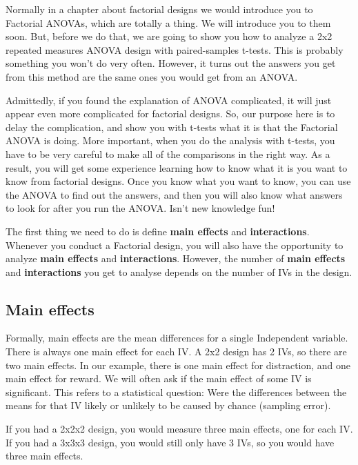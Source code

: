 \documentclass[
]{book}
\begin{document}
Normally in a chapter about factorial designs we would introduce you to Factorial ANOVAs, which are totally a thing. We will introduce you to them soon. But, before we do that, we are going to show you how to analyze a 2x2 repeated measures ANOVA design with paired-samples t-tests. This is probably something you won't do very often. However, it turns out the answers you get from this method are the same ones you would get from an ANOVA.

Admittedly, if you found the explanation of ANOVA complicated, it will just appear even more complicated for factorial designs. So, our purpose here is to delay the complication, and show you with t-tests what it is that the Factorial ANOVA is doing. More important, when you do the analysis with t-tests, you have to be very careful to make all of the comparisons in the right way. As a result, you will get some experience learning how to know what it is you want to know from factorial designs. Once you know what you want to know, you can use the ANOVA to find out the answers, and then you will also know what answers to look for after you run the ANOVA. Isn't new knowledge fun!

The first thing we need to do is define \textbf{main effects} and \textbf{interactions}. Whenever you conduct a Factorial design, you will also have the opportunity to analyze \textbf{main effects} and \textbf{interactions}. However, the number of \textbf{main effects} and \textbf{interactions} you get to analyse depends on the number of IVs in the design.

\hypertarget{main-effects}{%
\subsection{Main effects}\label{main-effects}}

Formally, main effects are the mean differences for a single Independent variable. There is always one main effect for each IV. A 2x2 design has 2 IVs, so there are two main effects. In our example, there is one main effect for distraction, and one main effect for reward. We will often ask if the main effect of some IV is significant. This refers to a statistical question: Were the differences between the means for that IV likely or unlikely to be caused by chance (sampling error).

If you had a 2x2x2 design, you would measure three main effects, one for each IV. If you had a 3x3x3 design, you would still only have 3 IVs, so you would have three main effects.
\end{document}
